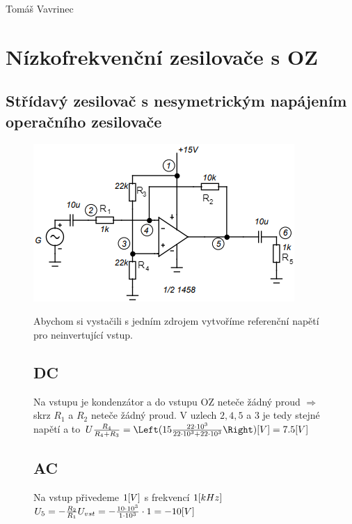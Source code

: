 \documentclass{article}
\begin{document}
Tomáš Vavrinec \- \- 

\section{Nízkofrekvenční zesilovače s OZ}
\subsection*{Střídavý zesilovač s nesymetrickým napájením operačního zesilovače}
\begin{figure}[H]
  \begin{minipage}[t]{0.48\textwidth}
    \vspace{10mm}
    \includegraphics[width=\textwidth]{uvod/posun.png}
  \end{minipage}
  \hfill
  \begin{minipage}[t]{0.48\textwidth}
    Abychom si vystačili s jedním zdrojem vytvoříme referenční napětí pro neinvertující vstup.

    \subsection{DC}
      Na vstupu je kondenzátor a do vstupu OZ neteče žádný proud \(\Rightarrow\) skrz \(R_1\) a \(R_2\) neteče žádný proud.
      V uzlech \(2, 4, 5\) a \(3\) je tedy stejné napětí a to \(U\frac{R_4}{R_4 + R_3} = \Left(15\frac{22\cdot10^{3}}{22\cdot10^{3}+22\cdot10^{3}} \Right) \-[V]= 7.5\-[V]\)
    \subsection{AC} 
      Na vstup přivedeme \(1\-[V]\) s frekvencí \(1\-[kHz]\)
      \(
        U_{5} = -\frac{R_2}{R_1} U_{vst} = -\frac{10\cdot10^{3}}{1\cdot10^{3}} \cdot 1 = -10\-[V]
      \)    
  \end{minipage}
\end{figure}
\end{document}
